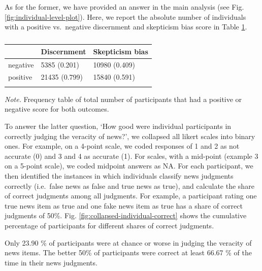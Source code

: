 \documentclass[
  man]{apa6}
\begin{document}
As for the former, we have provided an answer in the main analysis (see Fig. \ref{fig:individual-level-plot}). Here, we report the absolute number of individuals with a positive vs.~negative discernment and skepticism bias score in Table \ref{tab:individuals-direction}.

\begin{table}[tbp]

\begin{center}
\begin{threeparttable}

\caption{\label{tab:individuals-direction}}

\begin{tabular}{lll}
\toprule
 & \multicolumn{1}{c}{Discernment} & \multicolumn{1}{c}{Skepticism  bias}\\
\midrule
negative & 5385 (0.201) & 10980 (0.409)\\
positive & 21435 (0.799) & 15840 (0.591)\\
\bottomrule
\addlinespace
\end{tabular}

\begin{tablenotes}[para]
\normalsize{\textit{Note.} Frequency table of total number of participants that had a positive or negative score for both outcomes.}
\end{tablenotes}

\end{threeparttable}
\end{center}

\end{table}

To answer the latter question, `How good were individual participants in correctly judging the veracity of news?', we collapsed all likert scales into binary ones. For example, on a 4-point scale, we coded responses of 1 and 2 as not accurate (0) and 3 and 4 as accurate (1). For scales, with a mid-point (example 3 on a 5-point scale), we coded midpoint answers as NA. For each participant, we then identified the instances in which individuals classify news judgments correctly (i.e.~false news as false and true news as true), and calculate the share of correct judgments among all judgments. For example, a participant rating one true news item as true and one fake news item as true has a share of correct judgments of 50\%. Fig. \ref{fig:collapsed-individual-correct} shows the cumulative percentage of participants for different shares of correct judgments.

Only 23.90 \% of participants were at chance or worse in judging the veracity of news items. The better 50\% of participants were correct at least 66.67 \% of the time in their news judgments.
\end{document}
